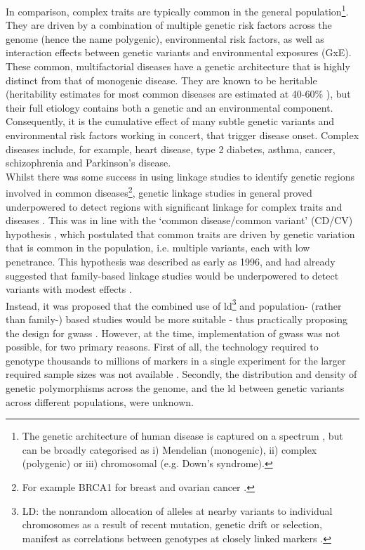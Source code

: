 In comparison, complex traits are typically common in the general population\footnote{The genetic architecture of human disease is captured on a spectrum \cite{manolio2009finding}, but can be broadly categorised as i) Mendelian (monogenic), ii) complex (polygenic) or iii) chromosomal (e.g. Down's syndrome).}.
They are driven by a combination of multiple genetic risk factors across the genome (hence the name polygenic), environmental risk factors, as well as interaction effects between genetic variants and environmental exposures (GxE).
These common, multifactorial diseases have a genetic architecture that is highly distinct from that of monogenic disease. 
They are known to be heritable (heritability estimates for most common diseases are estimated at 40-60\% \cite{manolio2009finding, prokopenko2009variants, kathiresan2008six, zeggini2008meta, harley2008genome}), but their full etiology contains both a genetic and an environmental component.
Consequently, it is the cumulative effect of many subtle genetic variants and environmental risk factors working in concert, that trigger disease onset.
Complex diseases include, for example, heart disease, type 2 diabetes, asthma, cancer, schizophrenia and Parkinson's disease.\\

Whilst there was some success in using linkage studies to identify genetic regions involved in common diseases\footnote{For example BRCA1 for breast and ovarian cancer  \cite{bailey2011linkage, miki1994strong}.}, genetic linkage studies in general proved underpowered to detect regions with significant linkage for complex traits and diseases \cite{bush2012genome, altmuller2001genomewide}. 
This was in line with the `common disease/common variant' (CD/CV) hypothesis \cite{bush2012genome, reich2001allelic}, which postulated that common traits are driven by genetic variation that is common in the population, i.e. multiple variants, each with low penetrance.
This hypothesis was described as early as 1996, and had already suggested that family-based linkage studies would be underpowered to detect variants with modest effects \cite{risch1996future}. \\

\label{sec:ld}
Instead, it was proposed that the combined use of \gls{ld}\footnote{LD: the nonrandom allocation of alleles at nearby variants to individual chromosomes as a result of recent mutation, genetic drift or selection, manifest as correlations between genotypes at closely linked markers \cite{mccarthy2008genome}.} and population- (rather than family-) based studies would be more suitable \cite{risch1996future, jorde2000linkage} - thus practically proposing the design for \glspl{gwas} \cite{risch1996future}.
However, at the time, implementation of \glspl{gwas} was not possible, for two primary reasons.
First of all, the technology required to genotype thousands to millions of markers in a single experiment for the larger required sample sizes was not available \cite{risch1996future, visscher2012five}.
Secondly, the distribution and density of genetic polymorphisms across the genome, and the \gls{ld} between genetic variants across different populations, were unknown.\\

